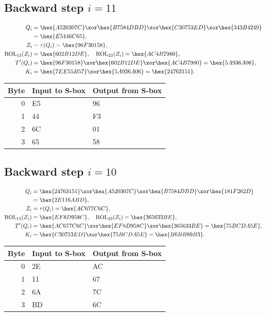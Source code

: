 \subsection*{Backward step $i=11$}
\begin{align*}
Q_i&=\hex{A520307C}\xor\hex{B7584DBD}\xor\hex{C30753ED}\xor\hex{343B4249}\\&=\hex{E5446C65},\\
Z_i&=\tau(Q_i)=\hex{96F30158},\\
\operatorname{ROL}_{13}(Z_i)&=\hex{602B12DE},\quad\operatorname{ROL}_{23}(Z_i)=\hex{AC4B7980},\\
T'(Q_i)&=\hex{96F30158}\xor\hex{602B12DE}\xor\hex{AC4B7980}=\hex{5A936A06},\\
K_i&=\hex{7EE55B57}\xor\hex{5A936A06}=\hex{24763151}.\end{align*}
\begingroup\small
\begin{longtable}{rll}
\toprule
Byte & Input to S-box & Output from S-box\\\midrule
\endhead
0 & E5 & 96\\
1 & 44 & F3\\
2 & 6C & 01\\
3 & 65 & 58\\
\bottomrule\end{longtable}
\endgroup
\subsection*{Backward step $i=10$}
\begin{align*}
Q_i&=\hex{24763151}\xor\hex{A520307C}\xor\hex{B7584DBD}\xor\hex{181F262D}\\&=\hex{2E116ABD},\\
Z_i&=\tau(Q_i)=\hex{AC677C6C},\\
\operatorname{ROL}_{13}(Z_i)&=\hex{EF8D958C},\quad\operatorname{ROL}_{23}(Z_i)=\hex{365633BE},\\
T'(Q_i)&=\hex{AC677C6C}\xor\hex{EF8D958C}\xor\hex{365633BE}=\hex{75BCDA5E},\\
K_i&=\hex{C30753ED}\xor\hex{75BCDA5E}=\hex{B6BB89B3}.\end{align*}
\begingroup\small
\begin{longtable}{rll}
\toprule
Byte & Input to S-box & Output from S-box\\\midrule
\endhead
0 & 2E & AC\\
1 & 11 & 67\\
2 & 6A & 7C\\
3 & BD & 6C\\
\bottomrule\end{longtable}
\endgroup
